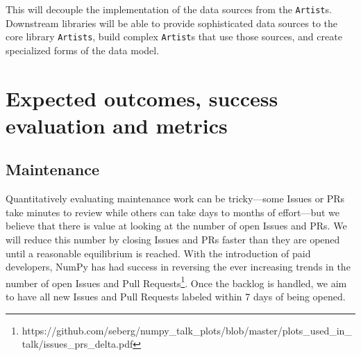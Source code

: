 \documentclass[11pt,letterpaper]{article}  %
\begin{document}
This will decouple the implementation of the data sources from the
\texttt{Artist}s.  Downstream libraries will be able to provide
sophisticated data sources to the core library \texttt{Artists}, build
complex \texttt{Artist}s that use those sources, and create
specialized forms of the data model.


\section{Expected outcomes, success evaluation and metrics}
\subsection{Maintenance}

Quantitatively evaluating maintenance work can be tricky---some Issues
or PRs take minutes to review while others can take days to months of
effort---but we believe that there is value at looking at the number
of open Issues and PRs.  We will reduce this number by closing Issues
and PRs faster than they are opened until a reasonable equilibrium is
reached. With the introduction of paid developers, NumPy has had
success in reversing the ever increasing trends in the number of open
Issues and Pull
Requests\footnote{https://github.com/seberg/numpy\_talk\_plots/blob/master/plots\_used\_in\_talk/issues\_prs\_delta.pdf}. Once
the backlog is handled, we aim to have all new Issues and Pull
Requests labeled within 7 days of being opened.
\end{document}
